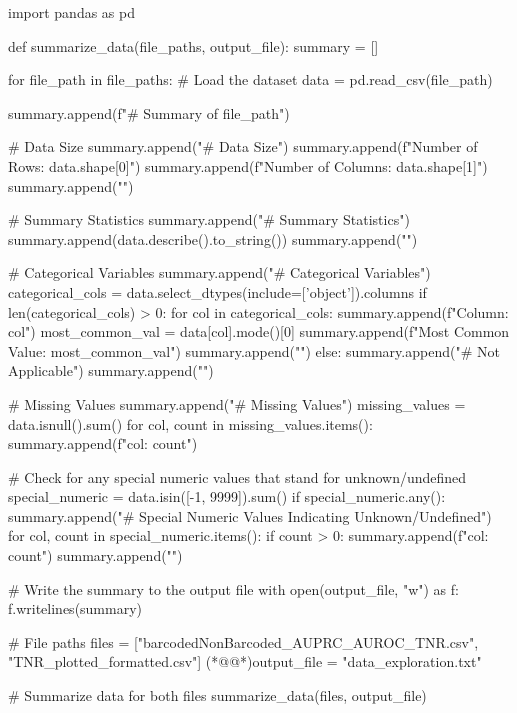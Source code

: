 \documentclass[11pt]{article}
\begin{document}
\begin{python}

import pandas as pd

def summarize_data(file_paths, output_file):
    summary = []

    for file_path in file_paths:
        # Load the dataset
        data = pd.read_csv(file_path)
        
        summary.append(f"# Summary of {file_path}\n")
        
        # Data Size
        summary.append("# Data Size\n")
        summary.append(f"Number of Rows: {data.shape[0]}\n")
        summary.append(f"Number of Columns: {data.shape[1]}\n")
        summary.append("\n")
        
        # Summary Statistics
        summary.append("# Summary Statistics\n")
        summary.append(data.describe().to_string())
        summary.append("\n\n")
        
        # Categorical Variables
        summary.append("# Categorical Variables\n")
        categorical_cols = data.select_dtypes(include=['object']).columns
        if len(categorical_cols) > 0:
            for col in categorical_cols:
                summary.append(f"Column: {col}\n")
                most_common_val = data[col].mode()[0]
                summary.append(f"Most Common Value: {most_common_val}\n")
                summary.append("\n")
        else:
            summary.append("# Not Applicable\n")
        summary.append("\n")

        # Missing Values
        summary.append("# Missing Values\n")
        missing_values = data.isnull().sum()
        for col, count in missing_values.items():
            summary.append(f"{col}: {count}\n")
        
        # Check for any special numeric values that stand for unknown/undefined
        special_numeric = data.isin([-1, 9999]).sum()
        if special_numeric.any():
            summary.append("\n# Special Numeric Values Indicating Unknown/Undefined\n")
            for col, count in special_numeric.items():
                if count > 0:
                    summary.append(f"{col}: {count}\n")
        summary.append("\n")

    # Write the summary to the output file
    with open(output_file, "w") as f:
        f.writelines(summary)

# File paths
files = ["barcodedNonBarcoded_AUPRC_AUROC_TNR.csv", "TNR_plotted_formatted.csv"]
(*@@*)output_file = "data_exploration.txt"

# Summarize data for both files
summarize_data(files, output_file)

\end{python}
\end{document}
